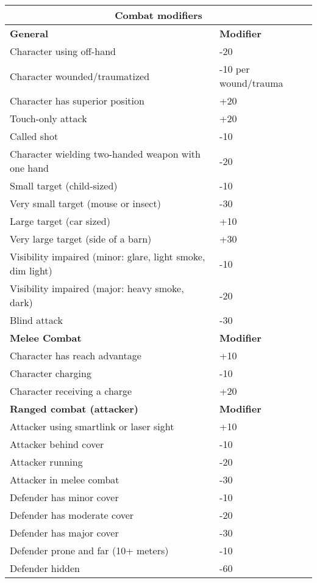 \begin{tabular}{|l|l|} %
\hline
\multicolumn{2}{|c|}{\textbf{Combat modifiers}} \\
\hline
\textbf{General} & \textbf{Modifier} \\ 
\hline
Character using off-hand & -20 \\
\hline
Character wounded/traumatized & -10 per wound/trauma \\
\hline
Character has superior position & +20 \\
\hline
Touch-only attack & +20 \\
\hline
Called shot & -10 \\
\hline
Character wielding two-handed weapon with one hand & -20 \\
\hline
Small target (child-sized) & -10 \\
\hline
Very small target (mouse or insect) & -30 \\
\hline
Large target (car sized) & +10 \\
\hline
Very large target (side of a barn) & +30 \\
\hline
Visibility impaired (minor: glare, light smoke, dim light) & -10 \\
\hline
Visibility impaired (major: heavy smoke, dark) & -20 \\
\hline
Blind attack & -30 \\
\hline
\textbf{Melee Combat} & \textbf{Modifier} \\
\hline
Character has reach advantage & +10 \\
\hline
Character charging & -10 \\
\hline
Character receiving a charge & +20 \\
\hline
\textbf{Ranged combat (attacker)} & \textbf{Modifier} \\
\hline
Attacker using smartlink or laser sight & +10 \\
\hline
Attacker behind cover & -10 \\
\hline
Attacker running & -20 \\
\hline
Attacker in melee combat & -30 \\
\hline
Defender has minor cover & -10 \\
\hline
Defender has moderate cover & -20 \\
\hline
Defender has major cover & -30 \\
\hline
Defender prone and far (10+ meters) & -10 \\
\hline
Defender hidden & -60 \\

\end{tabular}
